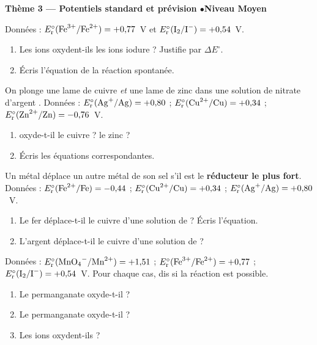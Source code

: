 \documentclass[11pt,a4paper]{article}
\begin{document}
\begin{center}\color{primarydark}\large\bfseries Thème 3 — Potentiels standard et prévision \quad$\bullet$\quad Niveau Moyen\end{center}

\begin{exo}
Données : $E_{\mathrm{r}}^{\circ}(\ce{Fe^{3+}}/\ce{Fe^{2+}})=+0{,}77$~V et
$E_{\mathrm{r}}^{\circ}(\ce{I2}/\ce{I^-})=+0{,}54$~V.
\begin{enumerate}[label=\alph*)]
  \item Les ions  oxydent-ils les ions iodure  ? Justifie par $\Delta E^{\circ}$.
  \item Écris l'équation de la réaction spontanée.
\end{enumerate}
\end{exo}

\begin{exo}
On plonge une lame de cuivre \emph{et} une lame de zinc dans une solution de nitrate d'argent
. Données : $E_{\mathrm{r}}^{\circ}(\ce{Ag+}/\ce{Ag})=+0{,}80$ ;
$E_{\mathrm{r}}^{\circ}(\ce{Cu^{2+}}/\ce{Cu})=+0{,}34$ ;
$E_{\mathrm{r}}^{\circ}(\ce{Zn^{2+}}/\ce{Zn})=-0{,}76$~V.
\begin{enumerate}[label=\alph*)]
  \item {} oxyde-t-il le cuivre ? le zinc ?
  \item Écris les équations correspondantes.
\end{enumerate}
\end{exo}

\begin{exo}
Un métal déplace un autre métal de son sel s'il est le \textbf{réducteur le plus fort}. Données :
$E_{\mathrm{r}}^{\circ}(\ce{Fe^{2+}}/\ce{Fe})=-0{,}44$ ;
$E_{\mathrm{r}}^{\circ}(\ce{Cu^{2+}}/\ce{Cu})=+0{,}34$ ;
$E_{\mathrm{r}}^{\circ}(\ce{Ag+}/\ce{Ag})=+0{,}80$~V.
\begin{enumerate}[label=\alph*)]
  \item Le fer déplace-t-il le cuivre d'une solution de  ? Écris l'équation.
  \item L'argent déplace-t-il le cuivre d'une solution de  ?
\end{enumerate}
\end{exo}

\begin{exo}
Données : $E_{\mathrm{r}}^{\circ}(\ce{MnO4^-}/\ce{Mn^{2+}})=+1{,}51$ ;
$E_{\mathrm{r}}^{\circ}(\ce{Fe^{3+}}/\ce{Fe^{2+}})=+0{,}77$ ;
$E_{\mathrm{r}}^{\circ}(\ce{I2}/\ce{I^-})=+0{,}54$~V. Pour chaque cas, dis si la réaction est possible.
\begin{enumerate}[label=\alph*)]
  \item Le permanganate oxyde-t-il  ?
  \item Le permanganate oxyde-t-il  ?
  \item Les ions  oxydent-ils  ?
\end{enumerate}
\end{exo}
\end{document}
